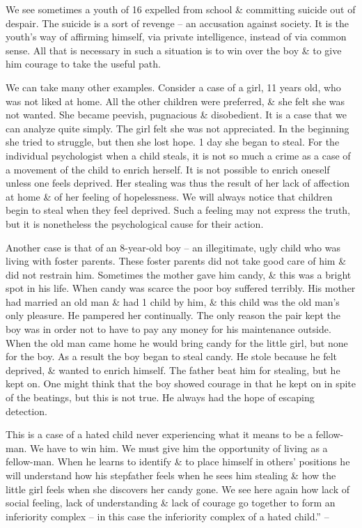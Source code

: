 \documentclass{article}
\begin{document}
We see sometimes a youth of 16 expelled from school \& committing suicide out of despair. The suicide is a sort of revenge -- an accusation against society. It is the youth's way of affirming himself, via private intelligence, instead of via common sense. All that is necessary in such a situation is to win over the boy \& to give him courage to take the useful path.

We can take many other examples. Consider a case of a girl, 11 years old, who was not liked at home. All the other children were preferred, \& she felt she was not wanted. She became peevish, pugnacious \& disobedient. It is a case that we can analyze quite simply. The girl felt she was not appreciated. In the beginning she tried to struggle, but then she lost hope. 1 day she began to steal. For the individual psychologist when a child steals, it is not so much a crime as a case of a movement of the child to enrich herself. It is not possible to enrich oneself unless one feels deprived. Her stealing was thus the result of her lack of affection at home \& of her feeling of hopelessness. We will always notice that children begin to steal when they feel deprived. Such a feeling may not express the truth, but it is nonetheless the psychological cause for their action.

Another case is that of an 8-year-old boy -- an illegitimate, ugly child who was living with foster parents. These foster parents did not take good care of him \& did not restrain him. Sometimes the mother gave him candy, \& this was a bright spot in his life. When candy was scarce the poor boy suffered terribly. His mother had married an old man \& had 1 child by him, \& this child was the old man's only pleasure. He pampered her continually. The only reason the pair kept the boy was in order not to have to pay any money for his maintenance outside. When the old man came home he would bring candy for the little girl, but none for the boy. As a result the boy began to steal candy. He stole because he felt deprived, \& wanted to enrich himself. The father beat him for stealing, but he kept on. One might think that the boy showed courage in that he kept on in spite of the beatings, but this is not true. He always had the hope of escaping detection.

This is a case of a hated child never experiencing what it means to be a fellow-man. We have to win him. We must give him the opportunity of living as a fellow-man. When he learns to identify \& to place himself in others' positions he will understand how his stepfather feels when he sees him stealing \& how the little girl feels when she discovers her candy gone. We see here again how lack of social feeling, lack of understanding \& lack of courage go together to form an inferiority complex -- in this case the inferiority complex of a hated child.'' -- \cite[pp. 215--230]{Adler_science_living}
\end{document}
